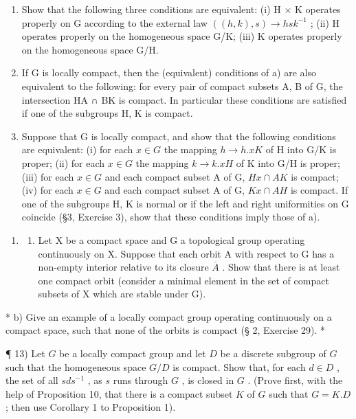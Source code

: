 \begin{enumerate}
\def\labelenumi{\alph{enumi})}
\item
  Show that the following three conditions are equivalent: (i) H × K operates properly on G according to the external law \(((h, k), s) \rightarrow hsk^{-1}\) ; (ii) H operates properly on the homogeneous space G/K; (iii) K operates properly on the homogeneous space G/H.
\item
  If G is locally compact, then the (equivalent) conditions of a) are also equivalent to the following: for every pair of compact subsets A, B of G, the intersection HA ∩ BK is compact. In particular these conditions are satisfied if one of the subgroups H, K is compact.
\item
  Suppose that G is locally compact, and show that the following conditions are equivalent: (i) for each \(x \in G\) the mapping \(h \to h.xK\) of H into G/K is proper; (ii) for each \(x \in G\) the mapping \(k \to k.xH\) of K into G/H is proper; (iii) for each \(x \in G\) and each compact subset A of G, \(Hx \cap AK\) is compact; (iv) for each \(x \in G\) and each compact subset A of G, \(Kx \cap AH\) is compact. If one of the subgroups H, K is normal or if the left and right uniformities on G coincide (§3, Exercise 3), show that these conditions imply those of a).
\end{enumerate}

\begin{enumerate}
\def\labelenumi{\arabic{enumi})}
\setcounter{enumi}{11}
\tightlist
\item
  \begin{enumerate}
  \def\labelenumii{\alph{enumii})}
  \tightlist
  \item
    Let X be a compact space and G a topological group operating continuously on X. Suppose that each orbit A with respect to G has a non-empty interior relative to its closure \(\overline{A}\) . Show that there is at least one compact orbit (consider a minimal element in the set of compact subsets of X which are stable under G).
  \end{enumerate}
\end{enumerate}

* b) Give an example of a locally compact group operating continuously on a compact space, such that none of the orbits is compact (§ 2, Exercise 29). *

¶ 13) Let \(G\) be a locally compact group and let \(D\) be a discrete subgroup of \(G\) such that the homogeneous space \(G / D\) is compact. Show that, for each \(d \in D\) , the set of all \(sds^{-1}\) , as \(s\) runs through \(G\) , is closed in \(G\) . (Prove first, with the help of Proposition 10, that there is a compact subset \(K\) of \(G\) such that \(G = K.D\) ; then use Corollary 1 to Proposition 1).

